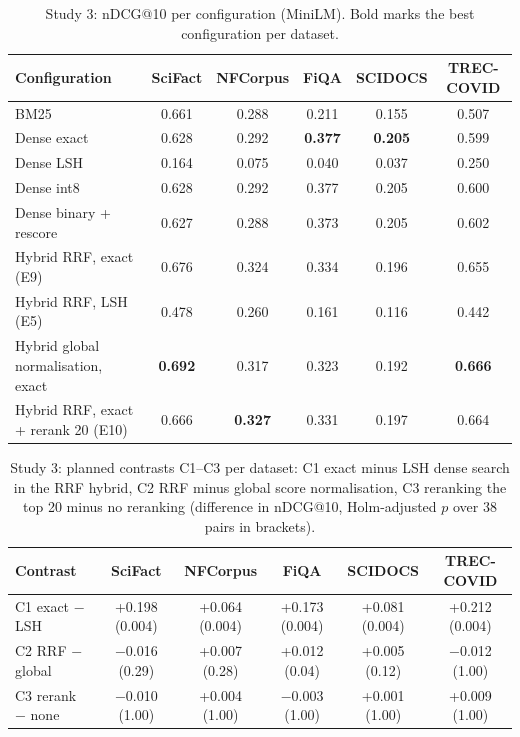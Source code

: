 \documentclass[pdflatex,sn-basic,Numbered]{sn-jnl}
\makeatletter
\newcommand{\ndcg}{nDCG@10}
\makeatother
\begin{document}
\begin{table}[tbp]
\centering\footnotesize\setlength{\tabcolsep}{3pt}
\caption{Study 3: \ndcg{} per configuration (MiniLM). Bold marks the best configuration per dataset.}
\label{tab:beir}
\begin{tabular}{lccccc}
\toprule
Configuration & SciFact & NFCorpus & FiQA & SCIDOCS & TREC-COVID \\
\midrule
BM25 & 0.661 & 0.288 & 0.211 & 0.155 & 0.507 \\
Dense exact & 0.628 & 0.292 & \textbf{0.377} & \textbf{0.205} & 0.599 \\
Dense LSH & 0.164 & 0.075 & 0.040 & 0.037 & 0.250 \\
Dense int8 & 0.628 & 0.292 & 0.377 & 0.205 & 0.600 \\
Dense binary + rescore & 0.627 & 0.288 & 0.373 & 0.205 & 0.602 \\
Hybrid RRF, exact (E9) & 0.676 & 0.324 & 0.334 & 0.196 & 0.655 \\
Hybrid RRF, LSH (E5) & 0.478 & 0.260 & 0.161 & 0.116 & 0.442 \\
Hybrid global normalisation, exact & \textbf{0.692} & 0.317 & 0.323 & 0.192 & \textbf{0.666} \\
Hybrid RRF, exact + rerank 20 (E10) & 0.666 & \textbf{0.327} & 0.331 & 0.197 & 0.664 \\
\bottomrule
\end{tabular}
\end{table}

\begin{table}[tbp]
\centering\footnotesize\setlength{\tabcolsep}{3pt}
\caption{Study 3: planned contrasts C1--C3 per dataset: C1 exact minus LSH dense search in the RRF hybrid, C2 RRF minus global score normalisation, C3 reranking the top 20 minus no reranking (difference in \ndcg{}, Holm-adjusted $p$ over 38 pairs in brackets).}
\label{tab:beircontrasts}
\begin{tabular}{lccccc}
\toprule
Contrast & SciFact & NFCorpus & FiQA & SCIDOCS & TREC-COVID \\
\midrule
C1 exact $-$ LSH & +0.198 (0.004) & +0.064 (0.004) & +0.173 (0.004) & +0.081 (0.004) & +0.212 (0.004) \\
C2 RRF $-$ global & $-$0.016 (0.29) & +0.007 (0.28) & +0.012 (0.04) & +0.005 (0.12) & $-$0.012 (1.00) \\
C3 rerank $-$ none & $-$0.010 (1.00) & +0.004 (1.00) & $-$0.003 (1.00) & +0.001 (1.00) & +0.009 (1.00) \\
\bottomrule
\end{tabular}
\end{table}
\end{document}
